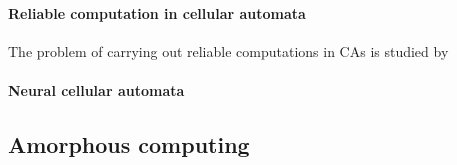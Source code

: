 \paragraph{Reliable computation in cellular automata}
The problem of carrying out reliable computations in \acp{CA} is studied by
\parencite{gacsReliableComputationCellular1986}

\paragraph{Neural cellular automata}
\parencite{mordvintsevGrowingNeuralCellular2020,
  randazzoSelfclassifyingMNISTDigits2020, niklassonSelfOrganisingTextures2021}

\subsection{Amorphous computing}
